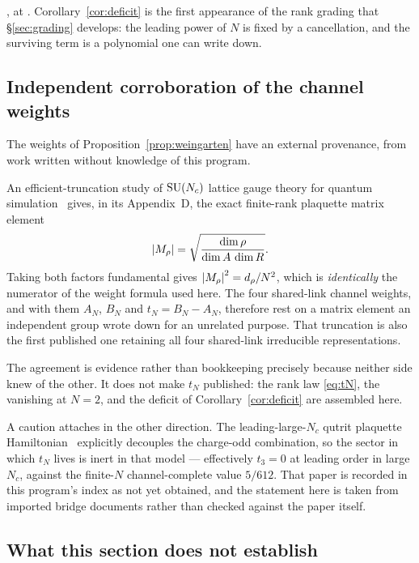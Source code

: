 \noindent\Tzero{}, at .
Corollary~\ref{cor:deficit} is the first appearance of the rank grading
that \S\ref{sec:grading} develops: the leading power of $N$ is fixed by
a cancellation, and the surviving term is a polynomial one can write
down.

\subsection{Independent corroboration of the channel weights}

The weights of Proposition~\ref{prop:weingarten} have an external
provenance, from work written without knowledge of this program.

An efficient-truncation study of $\mathrm{SU}(N_c)$ lattice gauge theory for
quantum simulation~\cite{CBB_2026} gives, in its Appendix~D, the exact
finite-rank plaquette matrix element
\begin{equation}
  \left\lvert M_\rho \right\rvert = \sqrt{\frac{\dim\rho}{\dim A \,\dim R}} .
\end{equation}
Taking both factors fundamental gives $\left\lvert M_\rho \right\rvert^2 = d_\rho/N^2$,
which is \emph{identically} the numerator of the weight formula used
here. The four shared-link channel weights, and with them $A_N$, $B_N$
and $t_N = B_N - A_N$, therefore rest on a matrix element an
independent group wrote down for an unrelated purpose. That truncation
is also the first published one retaining all four shared-link
irreducible representations.

The agreement is evidence rather than bookkeeping precisely because
neither side knew of the other. It does not make $t_N$ published: the
rank law \eqref{eq:tN}, the vanishing at $N = 2$, and the deficit of
Corollary~\ref{cor:deficit} are assembled here.

A caution attaches in the other direction. The leading-large-$N_c$
qutrit plaquette Hamiltonian~\cite{CB_2024} explicitly decouples the
charge-odd combination, so the sector in which $t_N$ lives is inert in
that model --- effectively $t_3 = 0$ at leading order in large $N_c$,
against the finite-$N$ channel-complete value $5/612$. That paper is
recorded in this program's index as not yet obtained, and the statement
here is taken from imported bridge documents rather than checked
against the paper itself.

\subsection{What this section does not establish}

